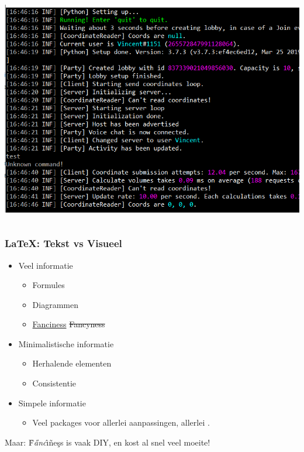 \documentclass[../presentatie.tex]{subfiles}
\begin{document}
\begin{frame}
\begin{columns}
\begin{column}{0.5\textwidth}
                \medskip
                \includegraphics[trim={0px 90px 0px 5px},clip,width=\linewidth,height=0.4\textheight,keepaspectratio]{assets/consoleOutput.png}
            \end{column}
        \end{columns}
    \end{frame}

    \addtorecentlist{\LaTeX}

    \begin{frame}
        \frametitle{\LaTeX: Tekst vs Visueel}
        
        \begin{itemize}
        	\item Veel informatie
        	\begin{itemize}
        		\item Formules
        		\item Diagrammen
        		\item {\setul{1pt}{1pt}\ul{Fanciness}} {\setul{0pt}{1pt}\st{Fancyness}}
        	\end{itemize}
        
        	\item Minimalistische informatie
        	\begin{itemize}
        		\item Herhalende elementen
        		\item Consistentie
        	\end{itemize}
        	
        	\item Simpele informatie
        	\begin{itemize}
        		\item Veel packages voor allerlei aanpassingen, allerlei .
        	\end{itemize}
        	
        \end{itemize}
    
    	\pause
    	Maar: \"F\textsl{\H{a}nc}\^{\i}\~ne\c{s}s is vaak DIY, en kost al snel veel moeite!
    \end{frame}
\end{document}
